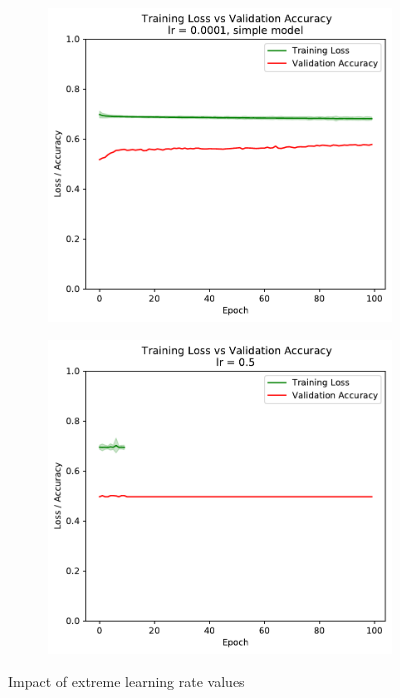 \documentclass[sigconf,nonacm]{acmart}
\begin{document}
\begin{figure}[ht]
\begin{subfigure}[c]{0.45\columnwidth}
\includegraphics[width=\textwidth]{plot_simple_0_0001.pdf}
\end{subfigure}
\hspace{2pt}
\begin{subfigure}[c]{0.45\columnwidth}
\includegraphics[width=\textwidth]{plot_0_5.pdf}
\end{subfigure}
\vspace{-.7\baselineskip}
\caption{Impact of extreme learning rate values}
\label{part2:learning-rate}
\end{figure}
\end{document}
